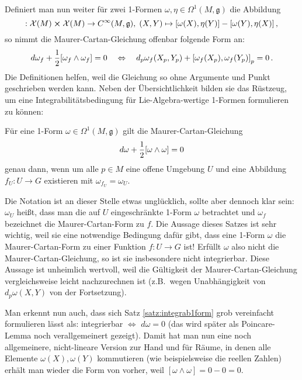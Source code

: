 \documentclass[../H_Analysis_main.tex]{subfiles}
\begin{document}
Definiert man nun weiter für zwei 1-Formen $\omega, \eta \in \Omega^1(M, \mathfrak{g})$ die Abbildung
\begin{equation*}
[\omega \wedge \eta]: \mathcal{X}(M) \cross \mathcal{X}(M) \rightarrow C^\infty(M, \mathfrak{g}), \; (X, Y) \mapsto \qty[\omega(X), \eta(Y)] - \qty[\omega(Y), \eta(X)] \, ,
\end{equation*}
so nimmt die Maurer-Cartan-Gleichung offenbar folgende Form an:
\begin{equation*}
d \omega_f + \frac{1}{2} [\omega_f \wedge \omega_f] = 0 \quad \Leftrightarrow \quad d_p\omega_f(X_p, Y_p) + \qty[\omega_f(X_p), \omega_f(Y_p)]_p = 0 \, .
\end{equation*}
Die Definitionen helfen, weil die Gleichung so ohne Argumente und Punkt geschrieben werden kann. Neben der Übersichtlichkeit bilden sie das Rüstzeug, um eine Integrabilitätsbedingung für Lie-Algebra-wertige 1-Formen formulieren zu können:
\begin{satz}
Für eine 1-Form $\omega \in \Omega^1(M, \mathfrak{g})$ gilt die Maurer-Cartan-Gleichung
\begin{equation*}
d \omega + \frac{1}{2} \qty[\omega \wedge \omega] = 0
\end{equation*}
genau dann, wenn um alle $p \in M$ eine offene Umgebung $U$ und eine Abbildung $f_U: U \rightarrow G$ existieren mit $\omega_{f_U} = \omega_U$.
\end{satz}
Die Notation ist an dieser Stelle etwas unglücklich, sollte aber dennoch klar sein: $\omega_U$ heißt, dass man die auf $U$ eingeschränkte 1-Form $\omega$ betrachtet und $\omega_f$ bezeichnet die Maurer-Cartan-Form zu $f$. Die Aussage dieses Satzes ist sehr wichtig, weil sie eine notwendige Bedingung dafür gibt, dass eine 1-Form $\omega$ die Maurer-Cartan-Form zu einer Funktion $f: U \rightarrow G$ ist! Erfüllt $\omega$ also nicht die Maurer-Cartan-Gleichung, so ist sie insbesondere nicht integrierbar. Diese Aussage ist unheimlich wertvoll, weil die Gültigkeit der Maurer-Cartan-Gleichung vergleichsweise leicht nachzurechnen ist (z.B.~wegen Unabhängigkeit von $d_p \omega(X, Y)$ von der Fortsetzung).


Man erkennt nun auch, dass sich Satz \ref{satz:integrab1form} grob vereinfacht formulieren lässt als: integrierbar $\Leftrightarrow$ $d\omega = 0$ (das wird später als Poincare-Lemma noch verallgemeinert gezeigt). Damit hat man nun eine noch allgemeinere, nicht-lineare Version zur Hand und für Räume, in denen alle Elemente $\omega(X), \omega(Y)$ kommutieren (wie beispielsweise die reellen Zahlen) erhält man wieder die Form von vorher, weil $[\omega \wedge \omega] = 0 - 0 = 0$.
\end{document}

